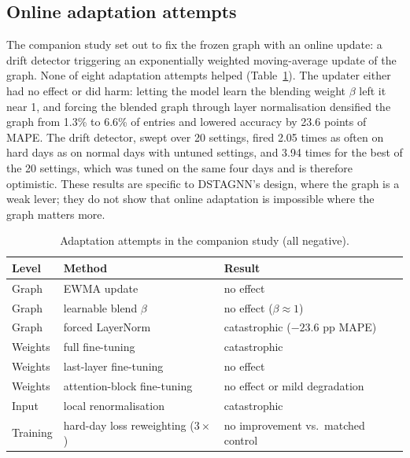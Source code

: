 \documentclass[conference]{IEEEtran}
\begin{document}
\subsection{Online adaptation attempts}
The companion study set out to fix the frozen graph with an online update: a drift detector triggering an exponentially weighted moving-average update of the graph. None of eight adaptation attempts helped (Table~\ref{tab:adapt}). The updater either had no effect or did harm: letting the model learn the blending weight $\beta$ left it near 1, and forcing the blended graph through layer normalisation densified the graph from 1.3\% to 6.6\% of entries and lowered accuracy by 23.6 points of MAPE. The drift detector, swept over 20 settings, fired 2.05 times as often on hard days as on normal days with untuned settings, and 3.94 times for the best of the 20 settings, which was tuned on the same four days and is therefore optimistic. These results are specific to DSTAGNN's design, where the graph is a weak lever; they do not show that online adaptation is impossible where the graph matters more.
\begin{table}[t]
\centering\caption{Adaptation attempts in the companion study (all negative).}\label{tab:adapt}
\footnotesize
\begin{tabular}{@{}llp{3.5cm}@{}}
\toprule
Level & Method & Result\\
\midrule
Graph & EWMA update & no effect\\
Graph & learnable blend $\beta$ & no effect ($\beta\approx1$)\\
Graph & forced LayerNorm & catastrophic ($-23.6$ pp MAPE)\\
Weights & full fine-tuning & catastrophic\\
Weights & last-layer fine-tuning & no effect\\
Weights & attention-block fine-tuning & no effect or mild degradation\\
Input & local renormalisation & catastrophic\\
Training & hard-day loss reweighting ($3\times$) & no improvement vs.\ matched control\\
\bottomrule
\end{tabular}
\end{table}
\end{document}
